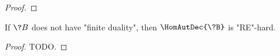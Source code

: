 \begin{proof}
\end{proof}


\begin{corollary}
	\AP\label{coro:lowerbound-homreg}
	If $\?B$ does not have "finite duality", then $\HomAutDec{\?B}$
	is "RE"-hard.
\end{corollary}

\begin{proof}
	TODO.
\end{proof}